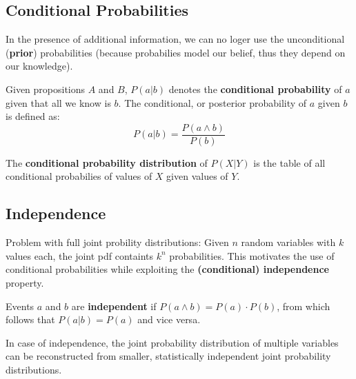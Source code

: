 \documentclass{scrartcl}
\begin{document}
\subsection{Conditional Probabilities}
In the presence of additional information, we can no loger use the unconditional (\textbf{prior}) probabilities (because probabilies model our belief, thus they depend on our knowledge).

Given propositions \(A\) and \(B\), \(P(a|b)\) denotes the \textbf{conditional probability} of \(a\) given that all we know is \(b\). The conditional, or posterior probability of \(a\) given \(b\) is defined as:
\[P(a|b) = \frac{P(a \land b)}{P(b)}\]

The \textbf{conditional probability distribution} of \(P(X|Y)\) is the table of all conditional probabilies of values of \(X\) given values of \(Y\).

\subsection{Independence}
Problem with full joint probility distributions: Given \(n\) random variables with \(k\) values each, the joint pdf containts \(k^n\) probabilities. This motivates the use of conditional probabilities while exploiting the \textbf{(conditional) independence} property.

Events \(a\) and \(b\) are \textbf{independent} if \(P(a \land b) = P(a) \cdot P(b)\), from which follows that \(P(a | b) = P(a)\) and vice versa.

In case of independence, the joint probability distribution of multiple variables can be reconstructed from smaller, statistically independent joint probability distributions.
\end{document}
